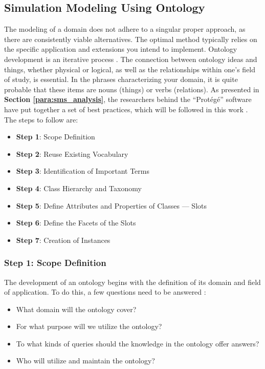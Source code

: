 \subsection{Simulation Modeling Using Ontology}
The modeling of a domain does not adhere to a singular proper approach, as there are consistently viable alternatives. The optimal method typically relies on the specific application and extensions you intend to implement. Ontology development is an iterative process \cite{noy2001ontology}. The connection between ontology ideas and things, whether physical or logical, as well as the relationships within one's field of study, is essential. In the phrases characterizing your domain, it is quite probable that these items are nouns (things) or verbs (relations). As presented in \textbf{Section \ref{para:sms_analysis}}, the researchers behind the “Protégé” software have put together a set of best practices, which will be followed in this work \cite{noy2001ontology}. The steps to follow are:

\begin{itemize}
    \item \textbf{Step 1}: Scope Definition
    \item \textbf{Step 2}: Reuse Existing Vocabulary
    \item \textbf{Step 3}: Identification of Important Terms
    \item \textbf{Step 4}: Class Hierarchy and Taxonomy
    \item \textbf{Step 5}: Define Attributes and Properties of Classes — Slots
    \item \textbf{Step 6}: Define the Facets of the Slots
    \item \textbf{Step 7}: Creation of Instances
\end{itemize}

    \subsubsection{Step 1: Scope Definition}
    The development of an ontology begins with the definition of its domain and field of application. To do this, a few questions need to be answered \cite{noy2001ontology}:
    
    \begin{itemize}
        \item What domain will the ontology cover? 
        \item For what purpose will we utilize the ontology? 
        \item To what kinds of queries should the knowledge in the ontology offer answers? 
        \item Who will utilize and maintain the ontology?
    \end{itemize}
    
